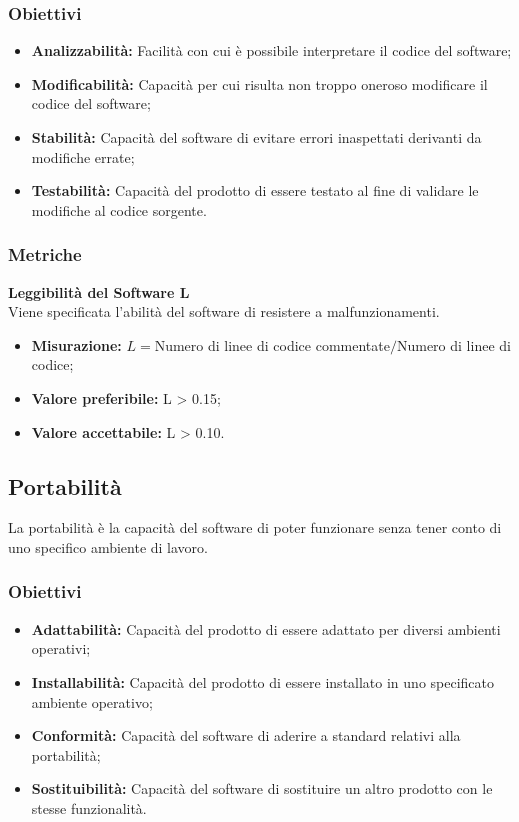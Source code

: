 \subsubsection{Obiettivi}
\begin{itemize}
	\item \textbf{Analizzabilità:} Facilità con cui è possibile interpretare il codice del software;
	\item \textbf{Modificabilità:} Capacità per cui risulta non troppo oneroso modificare il codice del software;
	\item \textbf{Stabilità:} Capacità del software di evitare errori inaspettati derivanti da modifiche errate;
	\item \textbf{Testabilità:} Capacità del prodotto di essere testato al fine di validare le modifiche al codice sorgente.
\end{itemize}
\subsubsection{Metriche}
\textbf{Leggibilità del Software L}\\
Viene specificata l'abilità del software di resistere a malfunzionamenti.
\begin{itemize}
	\item \textbf{Misurazione:} $L = $Numero di linee di codice commentate$ / $Numero di linee di codice;
	\item \textbf{Valore preferibile:} L > 0.15;
	\item \textbf{Valore accettabile:} L > 0.10.
\end{itemize}


\subsection{Portabilità}
La portabilità è la capacità del software di poter funzionare senza tener conto di uno specifico ambiente di lavoro.
\subsubsection{Obiettivi}
\begin{itemize}
	\item \textbf{Adattabilità:} Capacità del prodotto di essere adattato per diversi ambienti operativi;
	\item \textbf{Installabilità:} Capacità del prodotto di essere installato in uno specificato ambiente operativo;
	\item \textbf{Conformità:} Capacità del software di aderire a standard relativi alla portabilità;
	\item \textbf{Sostituibilità:} Capacità del software di sostituire un altro prodotto con le stesse funzionalità.
\end{itemize}
